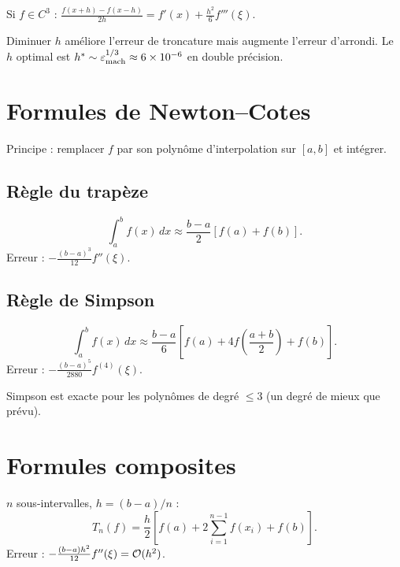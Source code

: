 \begin{theoreme}
Si $f\in C^3$ : $\frac{f(x+h)-f(x-h)}{2h}=f'(x)+\frac{h^2}{6}f'''(\xi)$.
\end{theoreme}

\begin{attention}
Diminuer $h$ am\'eliore l'erreur de troncature mais augmente l'erreur d'arrondi. Le $h$ optimal est $h^*\sim\varepsilon_{\mathrm{mach}}^{1/3}\approx 6\times 10^{-6}$ en double pr\'ecision.
\end{attention}

\section{Formules de Newton--Cotes}

Principe : remplacer $f$ par son polyn\^ome d'interpolation sur $[a,b]$ et int\'egrer.

\subsection{R\`egle du trap\`eze}

\begin{definition}
\[
\int_a^b f(x)\,dx \approx \frac{b-a}{2}[f(a)+f(b)].
\]
Erreur : $-\frac{(b-a)^3}{12}f''(\xi)$.
\end{definition}

\subsection{R\`egle de Simpson}

\begin{definition}
\[
\int_a^b f(x)\,dx \approx \frac{b-a}{6}\left[f(a)+4f\!\left(\frac{a+b}{2}\right)+f(b)\right].
\]
Erreur : $-\frac{(b-a)^5}{2880}f^{(4)}(\xi)$.
\end{definition}

\begin{theoreme}
Simpson est exacte pour les polyn\^omes de degr\'e $\leq 3$ (un degr\'e de mieux que pr\'evu).
\end{theoreme}

\section{Formules composites}

\begin{definition}
$n$ sous-intervalles, $h=(b-a)/n$ :
\[
T_n(f) = \frac{h}{2}\left[f(a)+2\sum_{i=1}^{n-1}f(x_i)+f(b)\right].
\]
Erreur : $-\frac{(b-a)h^2}{12}f''(\xi)=\mathcal{O}(h^2)$.
\end{definition}

